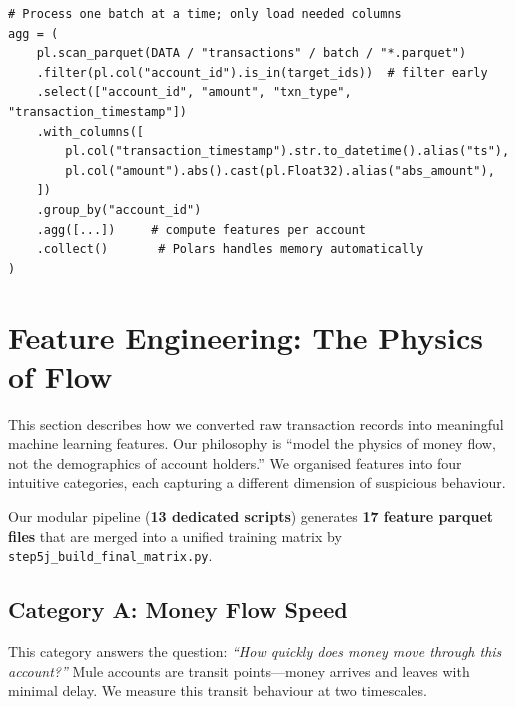 \documentclass[11pt, a4paper]{article}
\begin{document}
\begin{lstlisting}[caption={Polars streaming pipeline (from \texttt{step5g\_behavioral\_profiles.py}).}]
# Process one batch at a time; only load needed columns
agg = (
    pl.scan_parquet(DATA / "transactions" / batch / "*.parquet")
    .filter(pl.col("account_id").is_in(target_ids))  # filter early
    .select(["account_id", "amount", "txn_type", "transaction_timestamp"])
    .with_columns([
        pl.col("transaction_timestamp").str.to_datetime().alias("ts"),
        pl.col("amount").abs().cast(pl.Float32).alias("abs_amount"),
    ])
    .group_by("account_id")
    .agg([...])     # compute features per account
    .collect()       # Polars handles memory automatically
)
\end{lstlisting}


\section{Feature Engineering: The Physics of Flow}

This section describes how we converted raw transaction records into meaningful machine
learning features. Our philosophy is ``model the physics of money flow, not the demographics
of account holders.'' We organised features into four intuitive categories, each capturing a
different dimension of suspicious behaviour.

\medskip

Our modular pipeline (\textbf{13 dedicated scripts}) generates \textbf{17 feature parquet
files} that are merged into a unified training matrix by
\texttt{step5j\_build\_final\_matrix.py}.

\subsection{Category A: Money Flow Speed}

This category answers the question: \emph{``How quickly does money move through this
account?''} Mule accounts are transit points---money arrives and leaves with minimal delay.
We measure this transit behaviour at two timescales.
\end{document}
